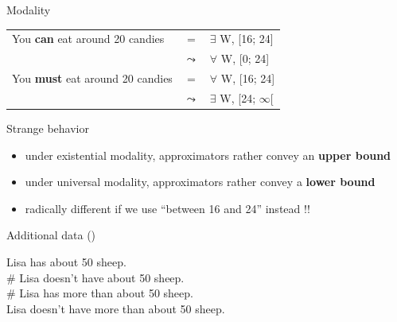 \documentclass[xcolor=table, hyperref={pdfpagelabels=false}]{beamer}
\begin{document}
\begin{frame}{Modality}
\begin{tabular}{lcl}
	You \textbf{can} eat around 20 candies &=& $\exists$ W, [16; 24]\\ &$\leadsto$& $\forall$ W, [0; 24] \vspace{2mm} \\ 
	You \textbf{must} eat around 20 candies &=& $\forall$ W, [16; 24]\\
	&$\leadsto$& $\exists$ W, [24; $\infty$[
\end{tabular}
\begin{alertblock}{Strange behavior}
	\begin{itemize}
		\item under existential modality, approximators rather convey an \textbf{upper bound}
		\item under universal modality, approximators rather convey a \textbf{lower bound}
		\item radically different if we use ``between 16 and 24'' instead !!
	\end{itemize}
\end{alertblock}
\end{frame}
\begin{frame}{Additional data (\cite{solt2017})}
\begin{center}
	Lisa has about 50 sheep.\\
	\# Lisa doesn’t have about 50 sheep.\\
	\# Lisa has more than about 50 sheep.\\
	Lisa doesn't have more than about 50 sheep.
\end{center}
\end{frame}
\end{document}
